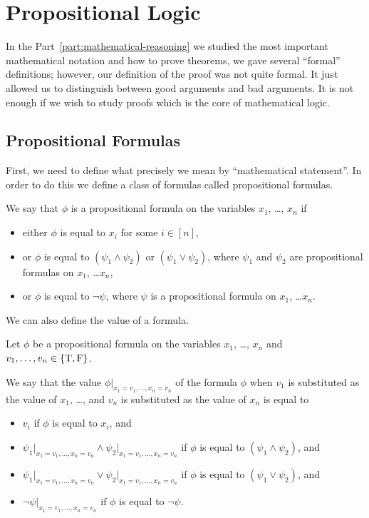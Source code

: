 \chapter{Propositional Logic}
In the Part~\ref{part:mathematical-reasoning} we studied the most important
mathematical notation and how to prove theorems, we gave several ``formal''
definitions; however, our definition of the proof was not quite formal. It just
allowed us to distinguish between good arguments and bad arguments. It is not
enough if we wish to study proofs which is the core of mathematical logic.

\section{Propositional Formulas}


First, we need to define what precisely we mean by ``mathematical statement''.
In order to do this we define a class of formulas called propositional formulas.
\begin{definition}
  We say that $\phi$ is a propositional formula on the variables $x_1$, \dots,
  $x_n$ if
  \begin{itemize}
    \item either $\phi$ is equal to $x_i$ for some $i \in [n]$,
    \item or $\phi$ is equal to $(\psi_1 \land \psi_2)$ or
      $(\psi_1 \lor \psi_2)$, where $\psi_1$ and $\psi_2$ are propositional
      formulas on $x_1$, \dots $x_n$,
    \item or $\phi$ is equal to $\lnot \psi$, where $\psi$ is a propositional
      formula on $x_1$, \dots $x_n$.
  \end{itemize}
\end{definition}

We can also define the value of a formula.
\begin{definition}
  Let $\phi$ be a propositional formula on the variables $x_1$, \dots, $x_n$
  and $v_1, \dots, v_n \in \set{\text{T}, \text{F}}$.

  We say that the value $\phi\big\rvert_{x_1 = v_1, \dots, x_n = v_n}$ of the
  formula $\phi$ when $v_1$ is substituted as the value of $x_1$, \dots,
  and $v_n$  is substituted as the value of $x_n$ is equal to
  \begin{itemize}
    \item $v_i$ if $\phi$ is equal to $x_i$, and
    \item $\psi_1\big\rvert_{x_1 = v_1, \dots, x_n = v_n} \land
      \psi_2\big\rvert_{x_1 = v_1, \dots, x_n = v_n}$ if
      $\phi$ is equal to $(\psi_1 \land \psi_2)$, and
    \item $\psi_1\big\rvert_{x_1 = v_1, \dots, x_n = v_n} \lor
      \psi_2\big\rvert_{x_1 = v_1, \dots, x_n = v_n}$ if
      $\phi$ is equal to $(\psi_1 \lor \psi_2)$, and
    \item $\lnot\psi\big\rvert_{x_1 = v_1, \dots, x_n = v_n}$
      if $\phi$ is equal to $\lnot \psi$.
  \end{itemize}
\end{definition}

